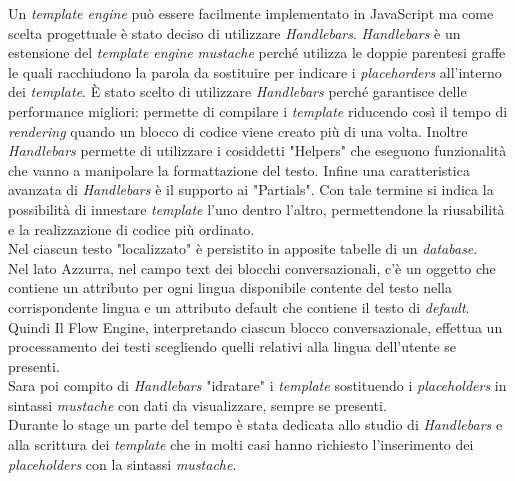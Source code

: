 Un \emph{template engine} può essere facilmente implementato in JavaScript ma come scelta progettuale è stato deciso di utilizzare \emph{Handlebars}. \emph{Handlebars} è un estensione del \emph{template engine} \emph{mustache} perché utilizza le doppie parentesi graffe le quali racchiudono la parola da sostituire per indicare i \emph{placehorders} all'interno dei \emph{template}. È stato scelto di utilizzare \emph{Handlebars} perché garantisce delle performance migliori: permette di compilare i \emph{template} riducendo così il tempo di \emph{rendering} quando un blocco di codice viene creato più di una volta. Inoltre \emph{Handlebars} permette di utilizzare i cosiddetti "Helpers" che eseguono funzionalità che vanno a manipolare la formattazione del testo. Infine una caratteristica avanzata di \emph{Handlebars} è il supporto ai "Partials". Con tale termine si indica la possibilità di innestare \emph{template} l’uno dentro l’altro, permettendone la riusabilità e la realizzazione di codice più ordinato.\\

Nel  ciascun testo "localizzato" è persistito in apposite tabelle di un \emph{database}.\\

Nel lato  Azzurra, nel campo text dei blocchi conversazionali, c'è un oggetto che contiene un attributo per ogni lingua disponibile contente del testo nella corrispondente lingua e un attributo default che contiene il testo di \emph{default}. Quindi Il Flow Engine, interpretando ciascun blocco conversazionale, effettua un processamento dei testi scegliendo quelli relativi alla lingua dell'utente se presenti.\\

Sara poi compito di \emph{Handlebars} "idratare" i \emph{template} sostituendo i \emph{placeholders} in sintassi \emph{mustache} con dati da visualizzare, sempre se presenti.\\

Durante lo stage un parte del tempo è stata dedicata allo studio di \emph{Handlebars} e alla scrittura dei \emph{template} che in molti casi hanno richiesto l'inserimento dei \emph{placeholders} con la sintassi \emph{mustache}.

